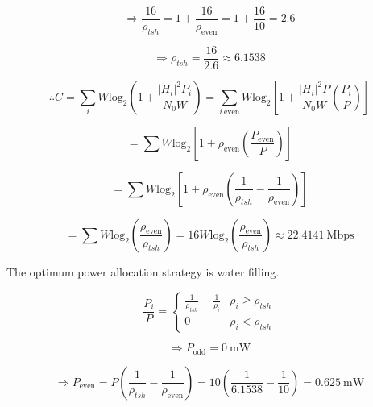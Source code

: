 \documentclass[fleqn]{article}
\begin{document}
\begin{enumerate}
		\begin{equation*}
			\Rightarrow \frac{16}{\rho_{tsh}} = 1 + \frac{16}{\rho_{\text{even}}} = 1 + \frac{16}{10} = 2.6
		\end{equation*}
		
		\begin{equation*}
			\Rightarrow \rho_{tsh} = \frac{16}{2.6} \approx 6.1538
		\end{equation*}
		
		\begin{equation*}
			\therefore C = \sum_i{W\text{log}_2\left(1 + \frac{|H_i|^2P_i}{N_0W}\right)} = \sum_{i\ \text{even}}{W\text{log}_2\left[1 + \frac{|H_i|^2P}{N_0W}\left(\frac{P_i}{P}\right)\right]}
		\end{equation*}
		
		\begin{equation*}
			= \sum{W\text{log}_2\left[1 + \rho_{\text{even}}\left(\frac{P_\text{even}}{P}\right)\right]}
		\end{equation*}
		
		\begin{equation*}
			 = \sum{W\text{log}_2\left[1 + \rho_{\text{even}}\left(\frac{1}{\rho_{tsh}} - \frac{1}{\rho_{\text{even}}}\right)\right]}
		\end{equation*}
		
		\begin{equation*}
			 = \sum{W\text{log}_2\left(\frac{\rho_{\text{even}}}{\rho_{tsh}}\right)} = 16W\text{log}_2\left(\frac{\rho_{\text{even}}}{\rho_{tsh}}\right) \approx 22.4141\ \text{Mbps}
		\end{equation*}
		
		The optimum power allocation strategy is water filling.
		
		\begin{equation*}
			\frac{P_i}{P} = \begin{cases}
				\frac{1}{\rho_{tsh}} - \frac{1}{\rho_i} & \rho_i \geq \rho_{tsh} \\
				0 & \rho_i < \rho_{tsh}
			\end{cases}
		\end{equation*}
		
		\begin{equation*}
			\Rightarrow P_{\text{odd}} = 0\ \text{mW}
		\end{equation*}
		
		\begin{equation*}
			\Rightarrow P_{\text{even}} = P\left(\frac{1}{\rho_{tsh}} - \frac{1}{\rho_{\text{even}}}\right) = 10\left(\frac{1}{6.1538} - \frac{1}{10}\right) = 0.625\ \text{mW}
		\end{equation*}		
		

\end{enumerate}
\end{document}
